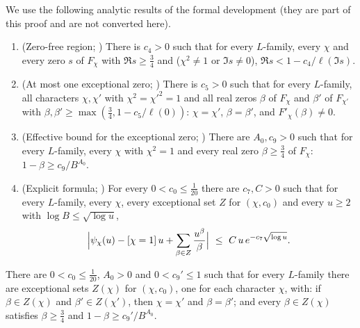 We use the following analytic results of the formal development (they are part of this proof and are not converted here).
\begin{enumerate}[label=(Z\arabic*)]
\item\label{pf:sh-misc:Z-zf} (Zero-free region; ) There is $c_4>0$ such that
for every $L$-family, every $\chi$ and every zero $s$ of $F_\chi$ with $\Re s\ge\frac34$ and ($\chi^2\ne1$ or $\Im s\ne0$),
$\Re s<1-c_4/\ell(\Im s)$.
\item\label{pf:sh-misc:Z-exc} (At most one exceptional zero;
) There is $c_5>0$ such that for every $L$-family, all characters
$\chi,\chi'$ with $\chi^2=\chi'^2=1$ and all real zeros $\beta$ of $F_\chi$ and $\beta'$ of $F_{\chi'}$ with $\beta,\beta'\ge\max(\frac34,1-c_5/\ell(0))$:
$\chi=\chi'$, $\beta=\beta'$, and $F'_\chi(\beta)\ne0$.
\item\label{pf:sh-misc:Z-far} (Effective bound for the exceptional zero;
) There are $A_0,c_9>0$ such that for every $L$-family, every $\chi$
with $\chi^2=1$ and every real zero $\beta\ge\frac34$ of $F_\chi$: $1-\beta\ge c_9/B^{A_0}$.
\item\label{pf:sh-misc:Z-psi} (Explicit formula; ) For every
$0<c_0\le\frac1{20}$ there are $c_7,C>0$ such that for every $L$-family, every $\chi$, every exceptional set $Z$ for $(\chi,c_0)$ and every $u\ge2$
with $\log B\le\sqrt{\log u}$,
\[
\Bigl|\psi_\chi(u)-[\chi=1]\,u+\sum_{\beta\in Z}\frac{u^\beta}\beta\Bigr|\ \le\ C\,u\,e^{-c_7\sqrt{\log u}}.
\]
\end{enumerate}

\begin{lemma}\label{pf:sh-misc:zeros}
There are $0<c_0\le\frac1{20}$, $A_0>0$ and $0<c_9'\le1$ such that for every $L$-family there are exceptional sets $Z(\chi)$ for $(\chi,c_0)$,
one for each character $\chi$, with: if $\beta\in Z(\chi)$ and $\beta'\in Z(\chi')$, then $\chi=\chi'$ and $\beta=\beta'$; and every $\beta\in Z(\chi)$
satisfies $\beta\ge\frac34$ and $1-\beta\ge c_9'/B^{A_0}$.
\end{lemma}

